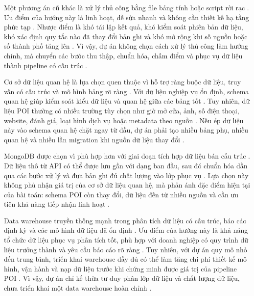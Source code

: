 Một phương án cũ khác là xử lý thủ công bằng file bảng tính hoặc script rời rạc \cite{ibmETL}. Ưu điểm của hướng này là linh hoạt, dễ sửa nhanh và không cần thiết kế hạ tầng phức tạp \cite{ibmETL}. Nhược điểm là khó tái lập kết quả, khó kiểm soát phiên bản dữ liệu, khó xác định quy tắc nào đã thay đổi bản ghi và khó mở rộng khi số nguồn hoặc số thành phố tăng lên \cite{ibmLineage}. Vì vậy, dự án không chọn cách xử lý thủ công làm hướng chính, mà chuyển các bước thu thập, chuẩn hóa, chấm điểm và phục vụ dữ liệu thành pipeline có cấu trúc \cite{ibmETL}.\par


Cơ sở dữ liệu quan hệ là lựa chọn quen thuộc vì hỗ trợ ràng buộc dữ liệu, truy vấn có cấu trúc và mô hình bảng rõ ràng \cite{ibmWarehouseLake}. Với dữ liệu nghiệp vụ ổn định, schema quan hệ giúp kiểm soát kiểu dữ liệu và quan hệ giữa các bảng tốt \cite{ibmWarehouseLake}. Tuy nhiên, dữ liệu POI thường có nhiều trường tùy chọn như giờ mở cửa, ảnh, số điện thoại, website, đánh giá, loại hình dịch vụ hoặc metadata theo nguồn \cite{mongodbDataModel}. Nếu ép dữ liệu này vào schema quan hệ chặt ngay từ đầu, dự án phải tạo nhiều bảng phụ, nhiều quan hệ và nhiều lần migration khi nguồn dữ liệu thay đổi \cite{mongodbDataModel}.\par

MongoDB được chọn vì phù hợp hơn với giai đoạn tích hợp dữ liệu bán cấu trúc \cite{mongodbDataModel}. Dữ liệu thô từ API có thể được lưu gần với dạng ban đầu, sau đó chuẩn hóa dần qua các bước xử lý và đưa bản ghi đủ chất lượng vào lớp phục vụ \cite{mongodbDataModel}. Lựa chọn này không phủ nhận giá trị của cơ sở dữ liệu quan hệ, mà phản ánh đặc điểm hiện tại của bài toán: schema POI còn thay đổi, dữ liệu đến từ nhiều nguồn và cần ưu tiên khả năng tiếp nhận linh hoạt \cite{yeboah2021}.\par

Data warehouse truyền thống mạnh trong phân tích dữ liệu có cấu trúc, báo cáo định kỳ và các mô hình dữ liệu đã ổn định \cite{ibmWarehouseLake}. Ưu điểm của hướng này là khả năng tổ chức dữ liệu phục vụ phân tích tốt, phù hợp với doanh nghiệp có quy trình dữ liệu trưởng thành và yêu cầu báo cáo rõ ràng \cite{ibmWarehouseLake}. Tuy nhiên, với dự án quy mô nhỏ đến trung bình, triển khai warehouse đầy đủ có thể làm tăng chi phí thiết kế mô hình, vận hành và nạp dữ liệu trước khi chứng minh được giá trị của pipeline POI \cite{ibmWarehouseLake}. Vì vậy, dự án chỉ kế thừa tư duy phân lớp dữ liệu và chất lượng dữ liệu, chưa triển khai một data warehouse hoàn chỉnh \cite{databricksMedallion}.\par


